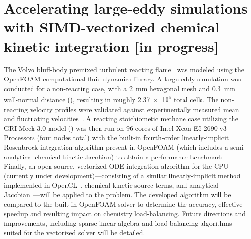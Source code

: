 \documentclass[a4paper,10pt]{article}
\begin{document}
\section{Accelerating large-eddy simulations with SIMD-vectorized chemical kinetic integration [in progress]}
The Volvo bluff-body premixed turbulent reacting flame~\cite{sjunnesson1991validation,sjunnesson1991lda} was modeled using the OpenFOAM computational fluid dynamics library.
A large eddy simulation was conducted for a non-reacting case, with a \SI{2}{\milli\meter} hexagonal mesh and \SI{0.3}{\milli\meter} wall-normal distance (), resulting in roughly \num{2.37e6} total cells.
The non-reacting velocity profiles were validated against experimentally measured mean and fluctuating velocities~\cite{sjunnesson1991validation,sjunnesson1991lda}.
A reacting stoichiometic methane case utilizing the GRI-Mech 3.0 model () was then run on \num{96} cores of Intel\raisebox{1ex}{\scriptsize{\textregistered}} Xeon\raisebox{1ex}{\scriptsize{\textregistered}} E5-2690 v3 Processors (four nodes total) with the built-in fourth-order linearly-implicit Rosenbrock integration algorithm present in OpenFOAM (which includes a semi-analytical chemical kinetic Jacobian) to obtain a performance benchmark.
Finally, an open-source, vectorized ODE integration algorithm for the CPU (currently under development)---consisting of a similar linearly-implicit method implemented in OpenCL~\cite{STONE201818}, chemical kinetic source terms, and analytical Jacobian~---will be applied to the problem.
The developed algorithm will be compared to the built-in OpenFOAM solver to determine the accuracy, effective speedup and resulting impact on chemistry load-balancing.
Future directions and improvements, including sparse linear-algebra and load-balancing algorithms suited for the vectorized solver will be detailed.
\end{document}
